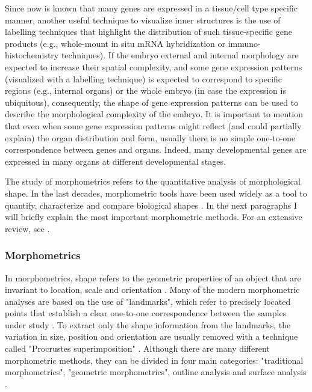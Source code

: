 Since now is known that many genes are expressed in a tissue/cell type specific manner, another useful technique to visualize inner structures is the use of labelling techniques that highlight the distribution of such tissue-specific gene products (e.g., whole-mount in situ mRNA hybridization or immuno-histochemistry techniques). 
If the embryo external and internal morphology are expected to increase their spatial complexity, and some gene expression patterns (visualized with a labelling technique) is expected to correspond to specific regions (e.g., internal organs) or the whole embryo (in case the expression is ubiquitous), consequently, the shape of gene expression patterns can be used to describe the morphological complexity of the embryo. It is important to mention that even when some gene expression patterns might reflect (and could partially explain) the organ distribution and form, usually there is no simple one-to-one correspondence between genes and organs. Indeed, many developmental genes are expressed in many organs at different developmental stages.

The study of morphometrics refers to the quantitative analysis of morphological shape. In the last decades, morphometric tools have been used widely as a tool to quantify, characterize and compare biological shapes \citep{JamesRohlf1993}. In the next paragraphs I will briefly explain the most important morphometric methods. For an extensive review, see \citep{Bookstein1997,Dryden1998,Zelditch2008,Slice2005}.


\subsubsection{Morphometrics}

In morphometrics, shape refers to the geometric properties of an object that are invariant to location, scale and orientation \citep{Slice2005}. Many of the modern morphometric analyses are based on the use of "landmarks", which refer to precisely located points that establish a clear one-to-one correspondence between the samples under study \citep{Klingenberg2010}. To extract only the shape information from the landmarks, the variation in size, position and orientation are usually removed with a technique called "Procrustes superimposition" \citep{Dryden1998}.
Although there are many different morphometric methods, they can be divided in four main categories: "traditional morphometrics", "geometric morphometrics", outline analysis and surface analysis \citep{Slice2005}.

